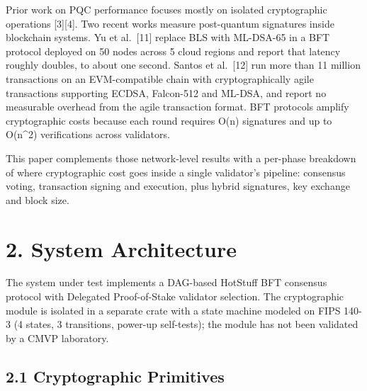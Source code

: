 \documentclass[
]{article}
\begin{document}
Prior work on PQC performance focuses mostly on isolated cryptographic
operations {[}3{]}{[}4{]}. Two recent works measure post-quantum
signatures inside blockchain systems. Yu et al.~{[}11{]} replace BLS
with ML-DSA-65 in a BFT protocol deployed on 50 nodes across 5 cloud
regions and report that latency roughly doubles, to about one second.
Santos et al.~{[}12{]} run more than 11 million transactions on an
EVM-compatible chain with cryptographically agile transactions
supporting ECDSA, Falcon-512 and ML-DSA, and report no measurable
overhead from the agile transaction format. BFT protocols amplify
cryptographic costs because each round requires O(n) signatures and up
to O(n\^{}2) verifications across validators.

This paper complements those network-level results with a per-phase
breakdown of where cryptographic cost goes inside a single validator's
pipeline: consensus voting, transaction signing and execution, plus
hybrid signatures, key exchange and block size.

\section{2. System Architecture}\label{system-architecture}

The system under test implements a DAG-based HotStuff BFT consensus
protocol with Delegated Proof-of-Stake validator selection. The
cryptographic module is isolated in a separate crate with a state
machine modeled on FIPS 140-3 (4 states, 3 transitions, power-up
self-tests); the module has not been validated by a CMVP laboratory.

\subsection{2.1 Cryptographic
Primitives}\label{cryptographic-primitives}
\end{document}
